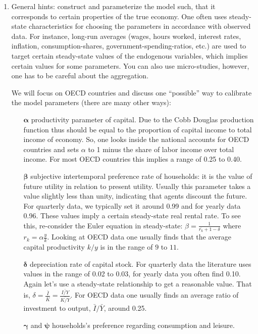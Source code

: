 \begin{enumerate}
\item General hints: construct and parameterize the model such, that it corresponds to certain properties of the true economy.
One often uses steady-state characteristics for choosing the parameters in accordance with observed data.
For instance, long-run averages (wages, hours worked, interest rates, inflation, consumption-shares, government-spending-ratios, etc.) are used 
  to target certain steady-state values of the endogenous variables, which implies certain values for some parameters.
You can also use micro-studies, however, one has to be careful about the aggregation.
			
We will focus on OECD countries and discuss one \enquote{possible} way to calibrate the model parameters (there are many other ways):
\begin{itemize}
\item[\(\boldsymbol{\alpha}\)] productivity parameter of capital.
Due to the Cobb Douglas production function thus should be equal to the proportion of capital income to total income of economy.
So, one looks inside the national accounts for OECD countries and sets \(\alpha\) to 1 minus the share of labor income over total income.
For most OECD countries this implies a range of 0.25 to 0.40.
\item[\(\boldsymbol{\beta}\)] subjective intertemporal preference rate of households:
  it is the value of future utility in relation to present utility.
Usually this parameter takes a value slightly less than unity, indicating that agents discount the future.
For quarterly data, we typically set it around 0.99 and for yearly data 0.96.
These values imply a certain steady-state real rental rate.
To see this, re-consider the Euler equation in steady-state: \(\beta = \frac{1}{\bar{r_k}+1-\delta}\) where \(r_k= \alpha \frac{y}{k}\).
Looking at OECD data one usually finds that the average capital productivity \(k/y\) is in the range of \(9\) to \(11\).
\item[\(\boldsymbol{\delta}\)] depreciation rate of capital stock.
For quarterly data the literature uses values in the range of 0.02 to 0.03, for yearly data you often find 0.10.
Again let's use a steady-state relationship to get a reasonable value.
That is, \(\delta=\frac{\bar{I}}{\bar{K}}=\frac{\bar{I/Y}}{\bar{K/Y}}\).
For OECD data one usually finds an average ratio of investment to output, \(\bar{I}/\bar{Y}\), around 0.25.
\item[\(\boldsymbol{\gamma}\) and \(\boldsymbol{\psi}\)] households's preference regarding consumption and leisure.

\end{itemize}
\end{enumerate}
